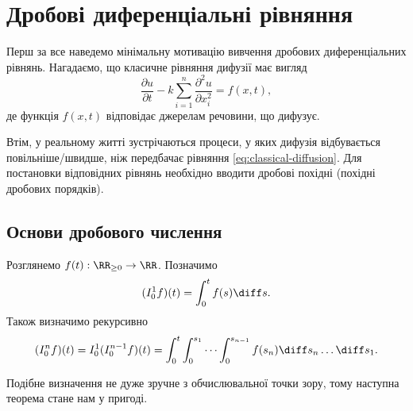 \section{Дробові диференціальні рівняння}

Перш за все наведемо мінімальну мотивацію вивчення дробових диференціальних рівнянь. Нагадаємо, що класичне рівняння дифузії має вигляд
\begin{equation}
    \label{eq:classical-diffusion}
    \frac{\partial u}{\partial t} - k \sum_{i = 1}^n \frac{\partial^2 u}{\partial x_i^2} = f(x, t),
\end{equation}
де функція $f(x, t)$ відповідає джерелам речовини, що дифузує. \medskip

Втім, у реальному житті зустрічаються процеси, у яких дифузія відбувається повільніше/швидше, ніж передбачає рівняння \eqref{eq:classical-diffusion}. Для постановки відповідних рівнянь необхідно вводити дробові похідні (похідні дробових порядків).

\subsection{Основи дробового числення}

Розглянемо $f(t): \RR_{\ge 0} \to \RR$. Позначимо
\begin{equation}
    (I_0^1 f)(t) = \int_0^t f(s) \diff s.
\end{equation}
Також визначимо рекурсивно 
\begin{equation}
    (I_0^n f)(t) = I_0^1 (I_0^{n - 1} f)(t) = \int_0^t \int_0^{s_1} \cdots \int_0^{s_{n - 1}} f(s_n) \diff s_n \ldots \diff s_1.
\end{equation}

Подібне визначення не дуже зручне з обчислювальної точки зору, тому наступна теорема стане нам у пригоді.

